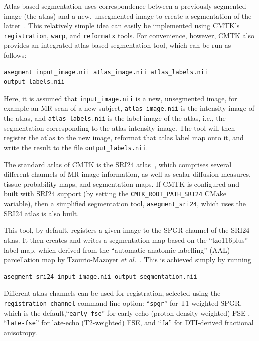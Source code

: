 \documentclass{InsightArticle}
\begin{document}
Atlas-based segmentation uses correspondence between a previously segmented
image (the atlas) and a new, unsegmented image to create a segmentation of the
latter~\cite{MillChriAmit:1993}. This relatively simple idea can easily be
implemented using CMTK's \verb|registration|, \verb|warp|, and
\verb|reformatx| tools. For convenience, however, CMTK also provides an
integrated atlas-based segmentation tool, which can be run as follows:
\begin{verbatim}
asegment input_image.nii atlas_image.nii atlas_labels.nii output_labels.nii
\end{verbatim}
Here, it is assumed that \verb|input_image.nii| is a new, unsegmented image,
for example an MR scan of a new subject, \verb|atlas_image.nii| is the
intensity image of the atlas, and \verb|atlas_labels.nii| is the label image
of the atlas, i.e., the segmentation corresponding to the atlas intensity
image. The tool will then register the atlas to the new image, reformat that
atlas label map onto it, and write the result to the file
\verb|output_labels.nii|.

The standard atlas of CMTK is the SRI24 
atlas~\cite{RohlZahrSull:2008,RohlZahrSull:2010}, which comprises several
different channels of MR image information, as well as scalar diffusion
measures, tissue probability maps, and segmentation maps. If CMTK is
configured and built with SRI24 support (by setting the
\verb|CMTK_ROOT_PATH_SRI24| CMake variable), then a simplified segmentation
tool, \verb|asegment_sri24|, which uses the SRI24 atlas is also built.

This tool, by default, registers a given image to the SPGR channel of the
SRI24 atlas. It then creates and writes a segmentation map based on the
``tzo116plus'' label map, which derived from the ``automatic anatomic
labelling'' (AAL)  parcellation map by
Tzourio-Mazoyer {\em et al.\/}~\cite{TzouLandPapa:2002}. This is achieved
simply by running
\begin{verbatim}
asegment_sri24 input_image.nii output_segmentation.nii
\end{verbatim} 
Different atlas channels can be used for registration, selected
using the \verb|--registration-channel| command line option: ``\verb|spgr|''
for T1-weighted SPGR, which is the default,``\verb|early-fse|'' for early-echo
(proton density-weighted) FSE , ``\verb|late-fse|'' for late-echo
(T2-weighted) FSE, and ``\verb|fa|'' for DTI-derived fractional anisotropy.
\end{document}
